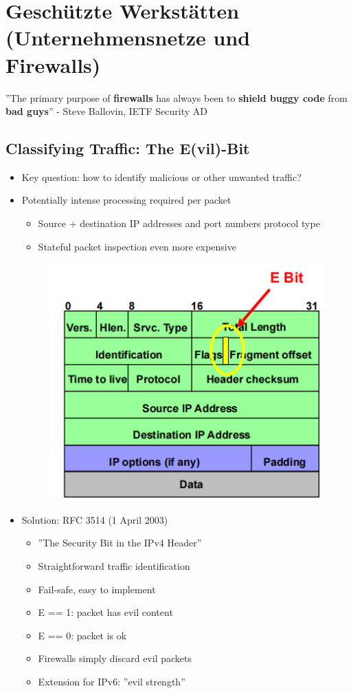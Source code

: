 \documentclass[openany]{book}
\begin{document}
\section{Geschützte Werkstätten (Unternehmensnetze und Firewalls)}

''The primary purpose of \textbf{firewalls} has always been to \textbf{shield buggy code} from \textbf{bad guys}'' - Steve Ballovin, IETF Security AD

\subsection{Classifying Traffic: The E(vil)-Bit}

\begin{itemize}
    \item Key question: how to identify malicious or other unwanted traffic?
    \item Potentially intense processing required per packet
    \begin{itemize}
        \item Source + destination IP addresses and port numbers protocol type
        \item Stateful packet inspection even more expensive
    \end{itemize}
    \begin{figure}[h!]
        \centering
        \includegraphics[width=0.45\linewidth]{Pics/EBit.PNG}
    \end{figure}
    \item Solution: RFC 3514 (1 April 2003)
    \begin{itemize}
        \item ''The Security Bit in the IPv4 Header''
        \item Straightforward traffic identification
        \item Fail-safe, easy to implement
        \item E == 1: packet has evil content
        \item E == 0: packet is ok
        \item Firewalls simply discard evil packets
        \item  Extension for IPv6: ''evil strength''
    \end{itemize}
\end{itemize}
\end{document}
